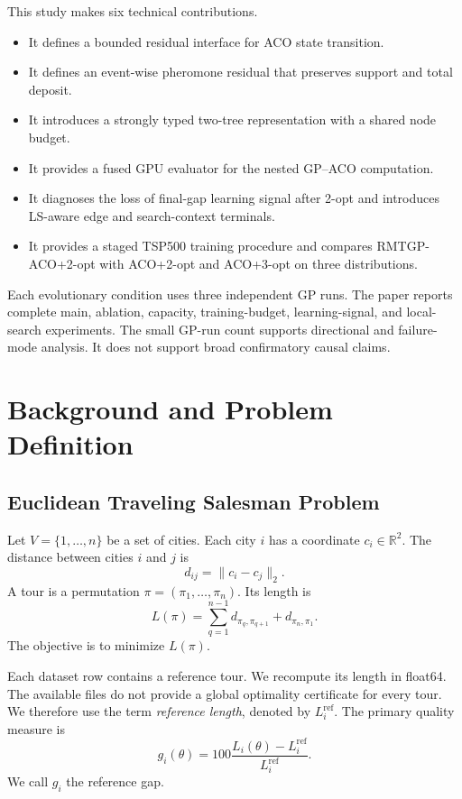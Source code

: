 \documentclass[letterpaper,journal]{IEEEtran}
\begin{document}
This study makes six technical contributions.
\begin{itemize}
    \item It defines a bounded residual interface for ACO state transition.
    \item It defines an event-wise pheromone residual that preserves support and total deposit.
    \item It introduces a strongly typed two-tree representation with a shared node budget.
    \item It provides a fused GPU evaluator for the nested GP--ACO computation.
    \item It diagnoses the loss of final-gap learning signal after 2-opt and
    introduces LS-aware edge and search-context terminals.
    \item It provides a staged TSP500 training procedure and compares
    RMTGP-ACO+2-opt with ACO+2-opt and ACO+3-opt on three distributions.
\end{itemize}

Each evolutionary condition uses three independent GP runs.
The paper reports complete main, ablation, capacity, training-budget,
learning-signal, and local-search experiments.
The small GP-run count supports directional and failure-mode analysis.
It does not support broad confirmatory causal claims.

\section{Background and Problem Definition}

\subsection{Euclidean Traveling Salesman Problem}

Let \(V=\{1,\ldots,n\}\) be a set of cities.
Each city \(i\) has a coordinate \(c_i\in\mathbb{R}^2\).
The distance between cities \(i\) and \(j\) is
\begin{equation}
    d_{ij}=\lVert c_i-c_j\rVert_2.
\end{equation}
A tour is a permutation \(\pi=(\pi_1,\ldots,\pi_n)\).
Its length is
\begin{equation}
    L(\pi)=
    \sum_{q=1}^{n-1}d_{\pi_q,\pi_{q+1}}
    +d_{\pi_n,\pi_1}.
\end{equation}
The objective is to minimize \(L(\pi)\).

Each dataset row contains a reference tour.
We recompute its length in float64.
The available files do not provide a global optimality certificate for every tour.
We therefore use the term \emph{reference length}, denoted by \(L_i^{\mathrm{ref}}\).
The primary quality measure is
\begin{equation}
    g_i(\theta)
    =
    100
    \frac{L_i(\theta)-L_i^{\mathrm{ref}}}
    {L_i^{\mathrm{ref}}}.
    \label{eq:reference-gap}
\end{equation}
We call \(g_i\) the reference gap.
\end{document}
